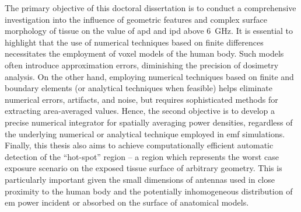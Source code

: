 The primary objective of this doctoral dissertation is to conduct a comprehensive investigation into the influence of geometric features and complex surface morphology of tissue on the value of \gls{apd} and \gls{ipd} above \SI{6}{\GHz}.
It is essential to highlight that the use of numerical techniques based on finite differences necessitates the employment of voxel models of the human body.
Such models often introduce approximation errors, diminishing the precision of dosimetry analysis.
On the other hand, employing numerical techniques based on finite and boundary elements (or analytical techniques when feasible) helps eliminate numerical errors, artifacts, and noise, but requires sophisticated methods for extracting area-averaged values.
Hence, the second objective is to develop a precise numerical integrator for spatially averaging power densities, regardless of the underlying numerical or analytical technique employed in \gls{emf} simulations.
Finally, this thesis also aims to achieve computationally efficient automatic detection of the ``hot-spot'' region -- a region which represents the worst case exposure scenario on the exposed tissue surface of arbitrary geometry.
This is particularly important given the small dimensions of antennas used in close proximity to the human body and the potentially inhomogeneous distribution of \gls{em} power incident or absorbed on the surface of anatomical models.

